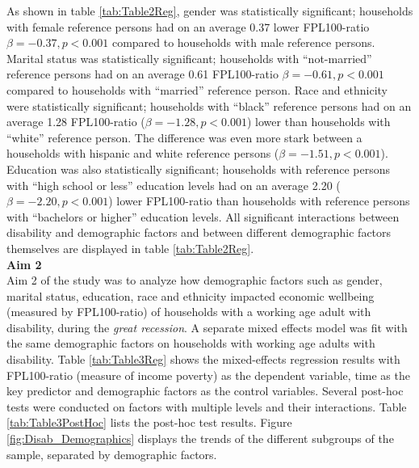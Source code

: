 \documentclass[11pt]{extarticle} %
\begin{document}
As shown in table \ref{tab:Table2Reg}, gender was statistically significant; households with female reference persons had on an average 0.37 lower FPL100-ratio $\beta = -0.37, p < 0.001$ compared to households with male reference persons. Marital status was statistically significant; households with ``not-married'' reference persons had on an average 0.61 FPL100-ratio $\beta = -0.61, p < 0.001$ compared to households with ``married'' reference person. Race and ethnicity were statistically significant; households with ``black'' reference persons had on an average 1.28 FPL100-ratio ($\beta = -1.28, p < 0.001$) lower than households with ``white'' reference person. The difference was even more stark between a households with hispanic and white reference persons ($\beta = -1.51, p < 0.001$). Education was also statistically significant; households with reference persons with ``high school or less'' education levels had on an average 2.20 ($\beta = -2.20, p < 0.001$) lower FPL100-ratio than households with reference persons with ``bachelors or higher'' education levels. All significant interactions between disability and demographic factors and between different demographic factors themselves are displayed in table \ref{tab:Table2Reg}. \\

\noindent
{\bf{Aim 2}}\\
Aim 2 of the study was to analyze how demographic factors such as gender, marital status, education, race and ethnicity impacted economic wellbeing (measured by FPL100-ratio) of households with a working age adult with disability, during the {\emph{great recession}}. A separate mixed effects model was fit with the same demographic factors on households with working age adults with disability. Table \ref{tab:Table3Reg} shows the mixed-effects regression results with FPL100-ratio (measure of income poverty) as the dependent variable, time as the key predictor and demographic factors as the control variables. Several post-hoc tests were conducted on factors with multiple levels and their interactions. Table \ref{tab:Table3PostHoc} lists the post-hoc test results. Figure \ref{fig:Disab_Demographics} displays the trends of the different subgroups of the sample, separated by demographic factors. 
\end{document}
